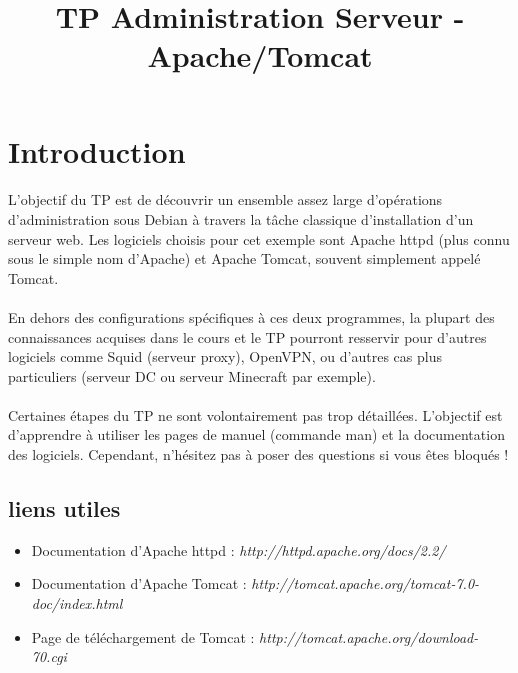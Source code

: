 \documentclass[12pt,a4paper]{article}
\title{TP Administration Serveur - Apache/Tomcat}
\begin{document}
\maketitle{}

\section{Introduction}
\paragraph{}
L'objectif du TP est de découvrir un ensemble assez large d'opérations d'administration sous Debian à travers la tâche classique d'installation d'un serveur web. Les logiciels choisis pour cet exemple sont Apache httpd (plus connu sous le simple nom d'Apache) et Apache Tomcat, souvent simplement appelé Tomcat.

\paragraph{}
En dehors des configurations spécifiques à ces deux programmes, la plupart des connaissances acquises dans le cours et le TP pourront resservir pour d'autres logiciels comme Squid (serveur proxy), OpenVPN, ou d'autres cas plus particuliers (serveur DC ou serveur Minecraft par exemple).

\paragraph{}
Certaines étapes du TP ne sont volontairement pas trop détaillées. L'objectif est d'apprendre à utiliser les pages de manuel (commande man) et la documentation des logiciels. Cependant, n'hésitez pas à poser des questions si vous êtes bloqués !

\subsection*{liens utiles}
    
\begin{itemize}
\item Documentation d'Apache httpd : \textit{http://httpd.apache.org/docs/2.2/}
\item Documentation d'Apache Tomcat : \textit{http://tomcat.apache.org/tomcat-7.0-doc/index.html}
\item Page de téléchargement de Tomcat : \textit{http://tomcat.apache.org/download-70.cgi}
\end{itemize}
\end{document}
